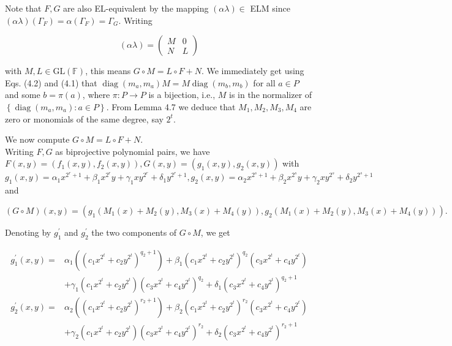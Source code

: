 \documentclass[10pt]{article}
\begin{document}
Note that $F, G$ are also EL-equivalent by the mapping $(\alpha \lambda) \in$ ELM since $(\alpha \lambda)\left(\Gamma_{F}\right)=\alpha\left(\Gamma_{F}\right)= \Gamma_{G}$. Writing

$$
(\alpha \lambda)=\left(\begin{array}{ll}
M & 0 \\
N & L
\end{array}\right)
$$

with $M, L \in \mathrm{GL}(\mathbb{F})$, this means $G \circ M=L \circ F+N$. We immediately get using Eqs. (4.2) and (4.1) that $\operatorname{diag}\left(m_{a}, m_{a}\right) M=M \operatorname{diag}\left(m_{b}, m_{b}\right)$ for all $a \in P$ and some $b=\pi(a)$, where $\pi: P \rightarrow P$ is a bijection, i.e., $M$ is in the normalizer of $\left\{\operatorname{diag}\left(m_{a}, m_{a}\right): a \in P\right\}$. From Lemma 4.7 we deduce that $M_{1}, M_{2}, M_{3}, M_{4}$ are zero or monomials of the same degree, say $2^{t}$.

We now compute $G \circ M=L \circ F+N$.\\
Writing $F, G$ as biprojective polynomial pairs, we have $F(x, y)=\left(f_{1}(x, y), f_{2}(x, y)\right), G(x, y)= \left(g_{1}(x, y), g_{2}(x, y)\right)$ with\\
$g_{1}(x, y)=\alpha_{1} x^{2^{r}+1}+\beta_{1} x^{2^{r}} y+\gamma_{1} x y^{2^{r}}+\delta_{1} y^{2^{r}+1}, g_{2}(x, y)=\alpha_{2} x^{2^{s}+1}+\beta_{2} x^{2^{s}} y+\gamma_{2} x y^{2^{s}}+\delta_{2} y^{2^{s}+1}$\\
and

$$
(G \circ M)(x, y)=\left(g_{1}\left(M_{1}(x)+M_{2}(y), M_{3}(x)+M_{4}(y)\right), g_{2}\left(M_{1}(x)+M_{2}(y), M_{3}(x)+M_{4}(y)\right)\right) .
$$

Denoting by $g_{1}^{\prime}$ and $g_{2}^{\prime}$ the two components of $G \circ M$, we get

$$
\begin{aligned}
g_{1}^{\prime}(x, y)= & \alpha_{1}\left(\left(c_{1} x^{2^{t}}+c_{2} y^{2^{t}}\right)^{q_{2}+1}\right)+\beta_{1}\left(c_{1} x^{2^{t}}+c_{2} y^{2^{t}}\right)^{q_{2}}\left(c_{3} x^{2^{t}}+c_{4} y^{2^{t}}\right) \\
& +\gamma_{1}\left(c_{1} x^{2^{t}}+c_{2} y^{2^{t}}\right)\left(c_{3} x^{2^{t}}+c_{4} y^{2^{t}}\right)^{q_{2}}+\delta_{1}\left(c_{3} x^{2^{t}}+c_{4} y^{2^{t}}\right)^{q_{2}+1} \\
g_{2}^{\prime}(x, y)= & \alpha_{2}\left(\left(c_{1} x^{2^{t}}+c_{2} y^{2^{t}}\right)^{r_{2}+1}\right)+\beta_{2}\left(c_{1} x^{2^{t}}+c_{2} y^{2^{t}}\right)^{r_{2}}\left(c_{3} x^{2^{t}}+c_{4} y^{2^{t}}\right) \\
& +\gamma_{2}\left(c_{1} x^{2^{t}}+c_{2} y^{2^{t}}\right)\left(c_{3} x^{2^{t}}+c_{4} y^{2^{t}}\right)^{r_{2}}+\delta_{2}\left(c_{3} x^{2^{t}}+c_{4} y^{2^{t}}\right)^{r_{2}+1}
\end{aligned}
$$
\end{document}
